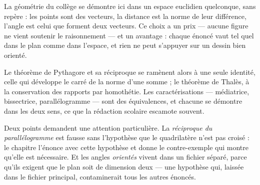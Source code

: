 La géométrie du collège se démontre ici dans un espace euclidien quelconque, sans repère :
les points sont des vecteurs, la distance est la norme de leur différence, l'angle est celui
que forment deux vecteurs. Ce choix a un prix — aucune figure ne vient soutenir le
raisonnement — et un avantage : chaque énoncé vaut tel quel dans le plan comme dans
l'espace, et rien ne peut s'appuyer sur un dessin bien orienté.

Le théorème de Pythagore et sa réciproque se ramènent alors à une seule identité, celle qui
développe le carré de la norme d'une somme ; le théorème de Thalès, à la conservation des
rapports par homothétie. Les caractérisations — médiatrice, bissectrice, parallélogramme —
sont des équivalences, et chacune se démontre dans les deux sens, ce que la rédaction
scolaire escamote souvent.

Deux points demandent une attention particulière. La \emph{réciproque du parallélogramme}
est fausse sans l'hypothèse que le quadrilatère n'est pas croisé : le chapitre l'énonce avec
cette hypothèse et donne le contre-exemple qui montre qu'elle est nécessaire. Et les angles
\emph{orientés} vivent dans un fichier séparé, parce qu'ils exigent que le plan soit de
dimension deux — une hypothèse qui, laissée dans le fichier principal, contaminerait tous
les autres énoncés.
